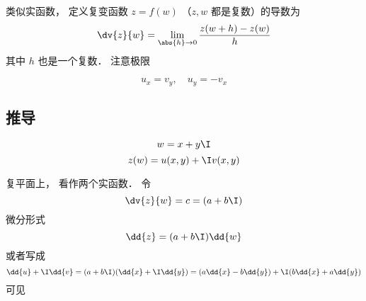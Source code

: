 
类似实函数， 定义复变函数 $z = f(w)$ （$z, w$ 都是复数）的导数为
\begin{equation}
\dv{z}{w} = \lim_{\abs{h}\to 0} \frac{z(w + h) - z(w)}{h}
\end{equation}
其中 $h$ 也是一个复数． 注意极限

\begin{equation}\label{CauRie_eq1}
u_{x}=v_{y}, \quad u_{y}=-v_{x}
\end{equation}


\subsection{推导}
\begin{equation}
w = x + y\I
\end{equation}
\begin{equation}
z(w) = u(x, y) + \I v(x, y)
\end{equation}


复平面上， 看作两个实函数． 令
\begin{equation}
\dv{z}{w} = c = (a + b\I)
\end{equation}
微分形式
\begin{equation}
\dd{z} = (a + b\I)\dd{w}
\end{equation}
或者写成
\begin{equation}
\dd{u} + \I \dd{v} = (a + b\I)(\dd{x} + \I\dd{y}) = (a \dd{x} - b\dd{y}) + \I (b \dd{x} + a\dd{y})
\end{equation}
可见
\begin{equation}

\end{equation}

